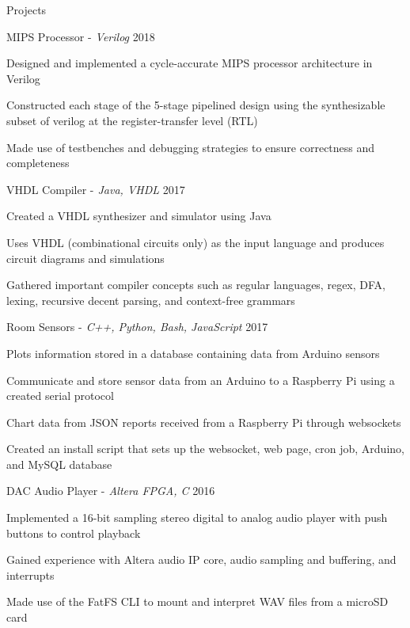 \documentclass{resume}
\begin{document}
\pagebreak  
\vspace*{20px}
\begin{rSection}{Projects}

\begin{rSubsection}{MIPS Processor -\em{ Verilog}}
{2018}{}{}
\item Designed and implemented a cycle-accurate MIPS processor architecture in Verilog
\item Constructed each stage of the 5-stage pipelined design using the synthesizable subset of verilog at the register-transfer level (RTL)
\item Made use of testbenches and debugging strategies to ensure correctness and completeness
\end{rSubsection}

\begin{rSubsection}{VHDL Compiler -\em{ Java, VHDL}}
{2017}{}{}
\item Created a VHDL synthesizer and simulator using Java
\item Uses VHDL (combinational circuits only) as the input language and produces circuit diagrams and simulations
\item Gathered important compiler concepts such as regular languages, regex, DFA, lexing, recursive decent parsing, and context-free grammars
\end{rSubsection}

\begin{rSubsection}{Room Sensors -\em{ C++, Python, Bash, JavaScript}}
{2017}{}{}
\item Plots information stored in a database containing data from Arduino sensors
\item Communicate and store sensor data from an Arduino to a Raspberry Pi using a created serial protocol
\item Chart data from JSON reports received from a Raspberry Pi through websockets
\item Created an install script that sets up the websocket, web page, cron job, Arduino, and MySQL database
\end{rSubsection}

\begin{rSubsection}{DAC Audio Player -\em{ Altera FPGA, C}}
{2016}{}{}
\item Implemented a 16-bit sampling stereo digital to analog audio player with push buttons to control playback
\item Gained experience with Altera audio IP core, audio sampling and buffering, and interrupts
\item Made use of the FatFS CLI to mount and interpret WAV files from a microSD card
\end{rSubsection}

\end{rSection}
\end{document}
